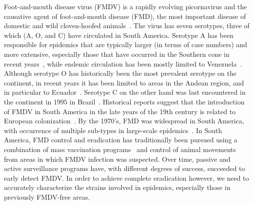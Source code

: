 \documentclass[10pt]{article}
\begin{document}
Foot-and-mouth disease virus (FMDV) is a rapidly evolving picornavirus and the causative agent of foot-and-mouth disease (FMD), the most important disease of domestic and wild cloven-hoofed animals~\cite{review}.
The virus has seven serotypes, three of which (A, O, and C) have circulated in South America.
Serotype A has been responsible for epidemics that are typically larger (in terms of case numbers) and more extensive, especially those that have occurred in the Southern cone in recent years~\cite{Perez2001, Malirat2012}, while endemic circulation has been mostly limited to Venezuela~\cite{Malirat2012}.
Although serotype O has historically been the most prevalent serotype on the continent, in recent years it has been limited to areas in the Andean region, and in particular to Ecuador~\cite{andean}.
Serotype C on the other hand was last encountered in the continent in $1995$ in Brazil~\cite{review_eradication}.
Historical reports suggest that the introduction of FMDV in South America in the late years of the 19th century is related to European colonization~\cite{Naranjo2013, tully}. 
By the 1970's, FMD was widespread in South America, with occurrence of multiple sub-types in large-scale epidemics~\cite{Saraiva2003}.
In South America, FMD control and eradication has traditionally been pursued using a combination of mass vaccination programs~\cite{vaccinationSA} and control of animal movements from areas in which FMDV infection was suspected.
Over time, passive and active surveillance programs have, with different degrees of success, succeeded to early detect FMDV.
In order to achieve complete eradication however, we need to accurately characterize the strains involved in epidemics, especially those in previously FMDV-free areas.
\end{document}
